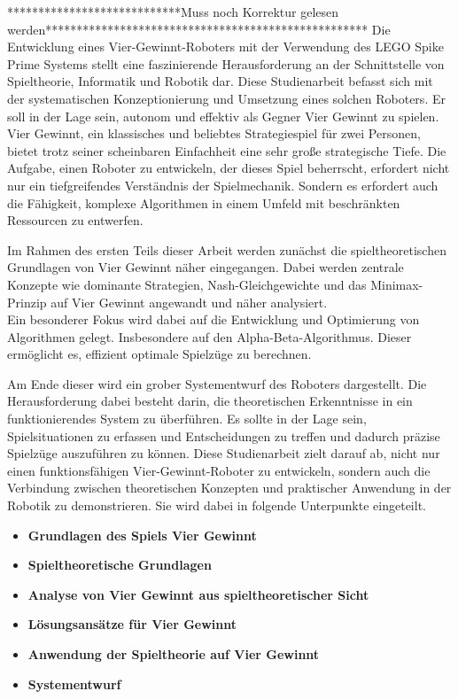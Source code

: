 ****************************Muss noch Korrektur gelesen werden****************************************************
Die Entwicklung eines Vier-Gewinnt-Roboters mit der Verwendung des LEGO Spike Prime Systems stellt eine faszinierende Herausforderung an der Schnittstelle von Spieltheorie, Informatik und Robotik dar. Diese Studienarbeit befasst sich mit der systematischen Konzeptionierung und Umsetzung eines solchen Roboters. Er soll in der Lage sein, autonom und effektiv als Gegner Vier Gewinnt zu spielen. \\
Vier Gewinnt, ein klassisches und beliebtes Strategiespiel für zwei Personen, bietet trotz seiner scheinbaren Einfachheit eine sehr große strategische Tiefe.
Die Aufgabe, einen Roboter zu entwickeln, der dieses Spiel beherrscht, erfordert nicht nur ein tiefgreifendes Verständnis der Spielmechanik. Sondern es erfordert auch die Fähigkeit, komplexe Algorithmen in einem  Umfeld  mit beschränkten Ressourcen zu entwerfen.

Im Rahmen des ersten Teils dieser Arbeit werden zunächst die spieltheoretischen Grundlagen von Vier Gewinnt näher eingegangen. Dabei werden zentrale Konzepte wie dominante Strategien, Nash-Gleichgewichte und das Minimax-Prinzip auf Vier Gewinnt angewandt und näher analysiert.\\
Ein besonderer Fokus wird dabei auf die Entwicklung und Optimierung von Algorithmen gelegt. Insbesondere auf den Alpha-Beta-Algorithmus. Dieser ermöglicht es, effizient optimale Spielzüge zu berechnen.

Am Ende dieser wird ein grober Systementwurf des Roboters dargestellt. Die Herausforderung dabei besteht darin, die theoretischen Erkenntnisse in ein funktionierendes System zu überführen. Es sollte in der Lage sein, Spielsituationen zu erfassen und Entscheidungen zu treffen und dadurch präzise Spielzüge auszuführen zu können.
Diese Studienarbeit zielt darauf ab, nicht nur einen funktionsfähigen Vier-Gewinnt-Roboter zu entwickeln, sondern auch die Verbindung zwischen theoretischen Konzepten und praktischer Anwendung in der Robotik zu demonstrieren. Sie wird dabei in folgende Unterpunkte eingeteilt.

\newpage

\begin{itemize}
	\item \textbf{Grundlagen des Spiels Vier Gewinnt}
	\item \textbf{Spieltheoretische Grundlagen}
	\item \textbf{Analyse von Vier Gewinnt aus spieltheoretischer Sicht}
	\item \textbf{Lösungsansätze für Vier Gewinnt}
	\item \textbf{Anwendung der Spieltheorie auf Vier Gewinnt}
	\item \textbf{Systementwurf}
\end{itemize}




